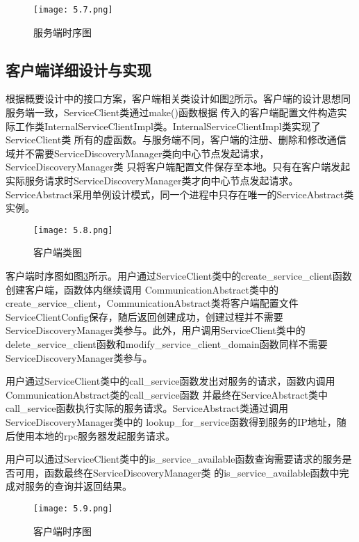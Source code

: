 \begin{figure}[htb]
  \centering
  \texttt{[image: 5.7.png]}
  \caption{服务端时序图}
  \label{server_timesequence}
\end{figure}

\subsection{客户端详细设计与实现}
根据概要设计中的接口方案，客户端相关类设计如图\ref{client_class}所示。客户端的设计思想同服务端一致，ServiceClient类通过make()函数根据
传入的客户端配置文件构造实际工作类InternalServiceClientImpl类。InternalServiceClientImpl类实现了ServiceClient类
所有的虚函数。与服务端不同，客户端的注册、删除和修改通信域并不需要ServiceDiscoveryManager类向中心节点发起请求，ServiceDiscoveryManager类
只将客户端配置文件保存至本地。只有在客户端发起实际服务请求时ServiceDiscoveryManager类才向中心节点发起请求。
ServiceAbstract采用单例设计模式，同一个进程中只存在唯一的ServiceAbstract类实例。

\begin{figure}[htb]
  \centering
  \texttt{[image: 5.8.png]}
  \caption{客户端类图}
  \label{client_class}
\end{figure}
客户端时序图如图\ref{client_timesequence}所示。用户通过ServiceClient类中的create\_service\_client函数创建客户端，函数体内继续调用
CommunicationAbstract类中的create\_service\_client，CommunicationAbstract类将客户端配置文件
ServiceClientConfig保存，随后返回创建成功，创建过程并不需要ServiceDiscoveryManager类参与。此外，用户调用ServiceClient类中的
delete\_service\_client函数和modify\_service\_client\_domain函数同样不需要ServiceDiscoveryManager类参与。

用户通过ServiceClient类中的call\_service函数发出对服务的请求，函数内调用CommunicationAbstract类的call\_service函数
并最终在ServiceAbstract类中call\_service函数执行实际的服务请求。ServiceAbstract类通过调用ServiceDiscoveryManager类中的
lookup\_for\_service函数得到服务的IP地址，随后使用本地的rpc服务器发起服务请求。

用户可以通过ServiceClient类中的is\_service\_available函数查询需要请求的服务是否可用，函数最终在ServiceDiscoveryManager类
的is\_service\_available函数中完成对服务的查询并返回结果。

\begin{figure}[H]
  \centering
  \texttt{[image: 5.9.png]}
  \caption{客户端时序图}
  \label{client_timesequence}
\end{figure}

